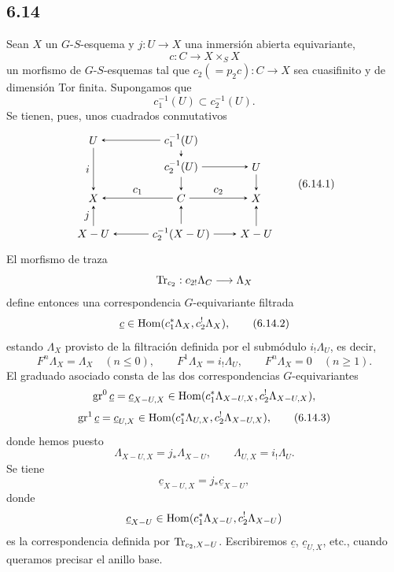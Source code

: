 \subsection*{6.14}
Sean $X$ un $G$-$S$-esquema y $j:U\to X$ una inmersión abierta equivariante,
\[
c:C\to X\times_SX
\]
un morfismo de $G$-$S$-esquemas tal que $c_2(=p_2c):C\to X$ sea cuasifinito y de dimensión Tor finita. Supongamos que
\[
c_1^{-1}(U)\subset c_2^{-1}(U).
\]
Se tienen, pues, unos cuadrados conmutativos
\begin{equation}
\begin{tikzpicture}[baseline=(current bounding box.center),>=stealth]
\node (U1) at (0,3.0) {$U$};
\node (C1U) at (2.8,3.0) {$c_1^{-1}(U)$};
\node (C2U) at (2.8,2.15) {$c_2^{-1}(U)$};
\node (U2) at (5.2,2.15) {$U$};
\node (X1) at (0,1.15) {$X$};
\node (C) at (2.8,1.15) {$C$};
\node (X2) at (5.2,1.15) {$X$};
\node (XU1) at (0,0) {$X-U$};
\node (C2XU) at (2.8,0) {$c_2^{-1}(X-U)$};
\node (XU2) at (5.2,0) {$X-U$};
\draw[->] (C1U) -- (U1);
\draw[->] (C1U) -- (C2U);
\draw[->] (C2U) -- (U2);
\draw[->] (U1) -- node[left] {$i$} (X1);
\draw[->] (U2) -- (X2);
\draw[->] (C2U) -- (C);
\draw[->] (C2XU) -- (C);
\draw[->] (C) -- node[above] {$c_1$} (X1);
\draw[->] (C) -- node[above] {$c_2$} (X2);
\draw[->] (XU1) -- node[left] {$j$} (X1);
\draw[->] (XU2) -- (X2);
\draw[->] (C2XU) -- (XU1);
\draw[->] (C2XU) -- (XU2);
\end{tikzpicture}
\tag{6.14.1}
\end{equation}
El morfismo de traza
\[
\operatorname{Tr}_{c_2}:c_{2!}\Lambda_C\longrightarrow \Lambda_X
\]
define entonces una correspondencia $G$-equivariante filtrada
\begin{equation}
\underline c\in\operatorname{Hom}(c_1^*\Lambda_X,c_2^!\Lambda_X),
\tag{6.14.2}
\end{equation}
estando $\Lambda_X$ provisto de la filtración definida por el submódulo $i_!\Lambda_U$, es decir,
\[
F^n\Lambda_X=\Lambda_X\quad(n\le0),\qquad
F^1\Lambda_X=i_!\Lambda_U,\qquad
F^n\Lambda_X=0\quad(n\ge1).
\]
El graduado asociado consta de las dos correspondencias $G$-equivariantes
\[
\operatorname{gr}^0\underline c=\underline c_{X-U,X}
\in\operatorname{Hom}(c_1^*\Lambda_{X-U,X},c_2^!\Lambda_{X-U,X}),
\]
\begin{equation}
\operatorname{gr}^1\underline c=\underline c_{U,X}
\in\operatorname{Hom}(c_1^*\Lambda_{U,X},c_2^!\Lambda_{X-U,X}),
\tag{6.14.3}
\end{equation}
donde hemos puesto
\[
\Lambda_{X-U,X}=j_*\Lambda_{X-U},\qquad
\Lambda_{U,X}=i_!\Lambda_U.
\]
Se tiene
\begin{equation}
\underline c_{X-U,X}=j_*\underline c_{X-U},
\tag{6.14.4}
\end{equation}
donde
\[
\underline c_{X-U}\in\operatorname{Hom}(c_1^*\Lambda_{X-U},c_2^!\Lambda_{X-U})
\]
es la correspondencia definida por $\operatorname{Tr}_{c_2,X-U}$. Escribiremos $\underline c$, $\underline c_{U,X}$, etc., cuando queramos precisar el anillo base.

